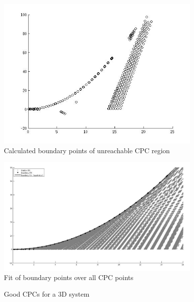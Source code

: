 \begin{figure}
\centering
\includegraphics[width=0.9\textwidth]{allbound.jpg}
\caption{Calculated boundary points of unreachable CPC region}
\label{fig:bound}
\end{figure}
%
\begin{figure}
\centering
\includegraphics[width=0.9\textwidth]{bound.jpg}
\caption{Fit of boundary points over all CPC points}
\end{figure}
%
\begin{figure}
\centering
{}
\caption{Good CPCs for a 3D system}
\label{fig:3d}
\end{figure}